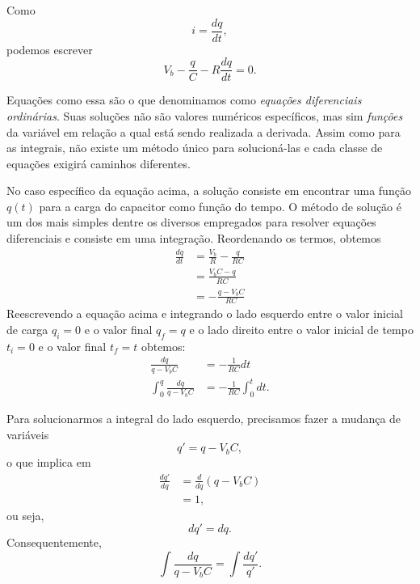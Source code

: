 Como
\begin{equation}
	i = \frac{dq}{dt},
\end{equation}
%
podemos escrever
\begin{equation}
	V_b - \frac{q}{C} - R\frac{dq}{dt} = 0.
\end{equation}

Equações como essa são o que denominamos como \emph{equações diferenciais ordinárias}. Suas soluções não são valores numéricos específicos, mas sim \emph{funções} da variável em relação a qual está sendo realizada a derivada. Assim como para as integrais, não existe um método único para solucioná-las e cada classe de equações exigirá caminhos diferentes.

No caso específico da equação acima, a solução consiste em encontrar uma função $q(t)$ para a carga do capacitor como função do tempo. O método de solução é um dos mais simples dentre os diversos empregados para resolver equações diferenciais e consiste em uma integração. Reordenando os termos, obtemos
\begin{align}
	\frac{dq}{dt} &= \frac{V_b}{R} - \frac{q}{RC}\\
	&= \frac{V_bC - q}{RC} \\
	&= - \frac{q - V_bC}{RC}
\end{align}
%
Reescrevendo a equação acima e integrando o lado esquerdo entre o valor inicial de carga $q_i = 0$ e o valor final $q_f = q$ e o lado direito entre o valor inicial de tempo $t_i = 0$ e o valor final $t_f = t$ obtemos:
\begin{align}
	\frac{dq}{q - V_bC} &= -\frac{1}{RC} dt \\
	\int_0^q \frac{dq}{q - V_bC} &= -\frac{1}{RC} \int_0^t dt.
\end{align}

Para solucionarmos a integral do lado esquerdo, precisamos fazer a mudança de variáveis
\begin{equation}
	q' = q - V_b C,
\end{equation}
%
o que implica em
\begin{align}
	\frac{dq'}{dq} &= \frac{d}{dq}(q - V_b C) \\
	&= 1,
\end{align}
%
ou seja, 
\begin{equation}
	dq' = dq.
\end{equation}
%
Consequentemente,
\begin{equation}
	\int \frac{dq}{q - V_bC} = \int \frac{dq'}{q'}.
\end{equation}

